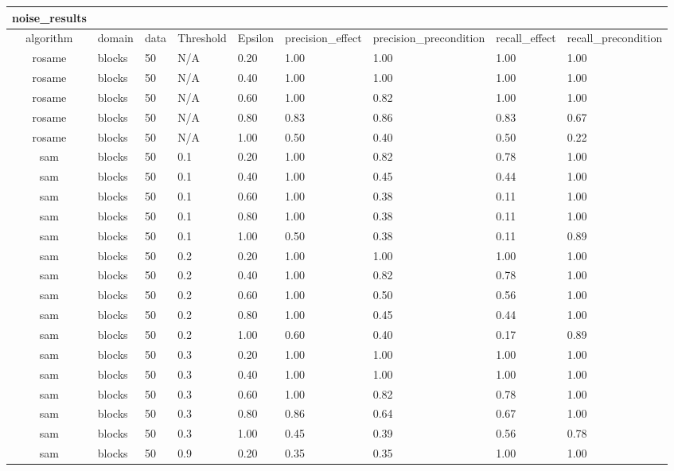 \begin{table}[ht]
\centering
\begin{tabular}{c}
\hline
noise_results \\ \hline
algorithm & domain & data & Threshold & Epsilon & precision_effect & precision_precondition & recall_effect & recall_precondition \\ \hline
rosame & blocks & 50 & N/A & 0.20 & 1.00 & 1.00 & 1.00 & 1.00 \\ \hline
rosame & blocks & 50 & N/A & 0.40 & 1.00 & 1.00 & 1.00 & 1.00 \\ \hline
rosame & blocks & 50 & N/A & 0.60 & 1.00 & 0.82 & 1.00 & 1.00 \\ \hline
rosame & blocks & 50 & N/A & 0.80 & 0.83 & 0.86 & 0.83 & 0.67 \\ \hline
rosame & blocks & 50 & N/A & 1.00 & 0.50 & 0.40 & 0.50 & 0.22 \\ \hline
sam & blocks & 50 & 0.1 & 0.20 & 1.00 & 0.82 & 0.78 & 1.00 \\ \hline
sam & blocks & 50 & 0.1 & 0.40 & 1.00 & 0.45 & 0.44 & 1.00 \\ \hline
sam & blocks & 50 & 0.1 & 0.60 & 1.00 & 0.38 & 0.11 & 1.00 \\ \hline
sam & blocks & 50 & 0.1 & 0.80 & 1.00 & 0.38 & 0.11 & 1.00 \\ \hline
sam & blocks & 50 & 0.1 & 1.00 & 0.50 & 0.38 & 0.11 & 0.89 \\ \hline
sam & blocks & 50 & 0.2 & 0.20 & 1.00 & 1.00 & 1.00 & 1.00 \\ \hline
sam & blocks & 50 & 0.2 & 0.40 & 1.00 & 0.82 & 0.78 & 1.00 \\ \hline
sam & blocks & 50 & 0.2 & 0.60 & 1.00 & 0.50 & 0.56 & 1.00 \\ \hline
sam & blocks & 50 & 0.2 & 0.80 & 1.00 & 0.45 & 0.44 & 1.00 \\ \hline
sam & blocks & 50 & 0.2 & 1.00 & 0.60 & 0.40 & 0.17 & 0.89 \\ \hline
sam & blocks & 50 & 0.3 & 0.20 & 1.00 & 1.00 & 1.00 & 1.00 \\ \hline
sam & blocks & 50 & 0.3 & 0.40 & 1.00 & 1.00 & 1.00 & 1.00 \\ \hline
sam & blocks & 50 & 0.3 & 0.60 & 1.00 & 0.82 & 0.78 & 1.00 \\ \hline
sam & blocks & 50 & 0.3 & 0.80 & 0.86 & 0.64 & 0.67 & 1.00 \\ \hline
sam & blocks & 50 & 0.3 & 1.00 & 0.45 & 0.39 & 0.56 & 0.78 \\ \hline
sam & blocks & 50 & 0.9 & 0.20 & 0.35 & 0.35 & 1.00 & 1.00 \\ \hline

\end{tabular}
\end{table}

